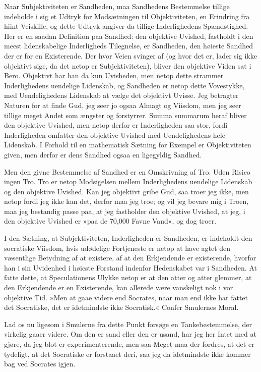 \documentclass[12pt,a4paper]{article}
\begin{document}
Naar Subjektiviteten er Sandheden, maa Sandhedens Bestemmelse tillige indeholde i sig et Udtryk for Modsætningen til Objektiviteten, en Erindring fra hiint Veiskille, og dette Udtryk angiver da tillige Inderlighedens Spændstighed. Her er en saadan Definition paa Sandhed: den objektive Uvished, fastholdt i den meest lidenskabelige Inderligheds Tilegnelse, er Sandheden, den høieste Sandhed der er for en Existerende. Der hvor Veien svinger af (og hvor det er, lader sig ikke objektivt sige, da det netop er Subjektiviteten), bliver den objektive Viden sat i Bero. Objektivt har han da kun Uvisheden, men netop dette strammer Inderlighedens uendelige Lidenskab, og Sandheden er netop dette Vovestykke, med Uendelighedens Lidenskab at vælge det objektivt Uvisse. Jeg betragter Naturen for at finde Gud, jeg seer jo ogsaa Almagt og Viisdom, men jeg seer tillige meget Andet som ængster og forstyrrer. Summa summarum heraf bliver den objektive Uvished, men netop derfor er Inderligheden saa stor, fordi Inderligheden omfatter den objektive Uvished med Uendelighedens hele Lidenskab. I Forhold til en mathematisk Sætning for Exempel er Objektiviteten given, men derfor er dens Sandhed ogsaa en ligegyldig Sandhed.

Men den givne Bestemmelse af Sandhed er en Omskrivning af Tro. Uden Risico ingen Tro. Tro er netop Modsigelsen mellem Inderlighedens uendelige Lidenskab og den objektive Uvished. Kan jeg objektivt gribe Gud, saa troer jeg ikke, men netop fordi jeg ikke kan det, derfor maa jeg troe; og vil jeg bevare mig i Troen, maa jeg bestandig passe paa, at jeg fastholder den objektive Uvished, at jeg, i den objektive Uvished er »paa de 70,000 Favne Vand«, og dog troer.

I den Sætning, at Subjektiviteten, Inderligheden er Sandheden, er indeholdt den socratiske Viisdom, hvis udødelige Fortjeneste er netop at have agtet den væsentlige Betydning af at existere, af at den Erkjendende er existerende, hvorfor han i sin Uvidenhed i høieste Forstand indenfor Hedenskabet var i Sandheden. At fatte dette, at Speculationens Ulykke netop er at den atter og atter glemmer, at den Erkjendende er en Existerende, kan allerede være vanskeligt nok i vor objektive Tid. »Men at gaae videre end Socrates, naar man end ikke har fattet det Socratiske, det er idetmindste ikke Socratisk.« Confer Smulernes Moral.

Lad os nu ligesom i Smulerne fra dette Punkt forsøge en Tankebestemmelse, der virkelig gaaer videre. Om den er sand eller den er usand, har jeg her Intet med at gjøre, da jeg blot er experimenterende, men saa Meget maa der fordres, at det er tydeligt, at det Socratiske er forstaaet deri, saa jeg da idetmindste ikke kommer bag ved Socrates igjen.
\end{document}
